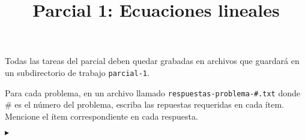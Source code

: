 \documentclass[12pt, parcial]{famaf}
\title{Parcial 1: Ecuaciones lineales}
\newenvironment{recomendaciones}[1]{%
       \itshape \bfseries
       \leavevmode\color{#1}\ignorespaces%
       }{\mdseries \upshape \vspace{1cm}}
\newcounter{ejnro}
\newenvironment{ejj}[1]%
{\addtocounter{ejnro}{1}\hspace{-1.2cm}$\blacktriangleright$\hspace{.3cm}{\textbf{\arabic{ejnro}.}}\hspace{.3cm}}%
{\vspace{5pt}}
\begin{document}
                            
 
\maketitle

\begin{recomendaciones}{charcoal}

Todas las tareas del parcial deben quedar grabadas en archivos
que guardará en un subdirectorio de trabajo {\tt parcial-1}.

Para cada problema, en un archivo llamado {\tt respuestas-problema-\#.txt}
donde \# es el número del problema,
escriba las repuestas requeridas en cada ítem.
Mencione el ítem correspondiente en cada respuesta. 
 
\end{recomendaciones}



   \begin{ejj}

      \VAR{ej}

   \end{ejj}

\end{document}
